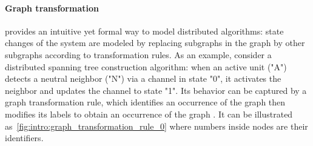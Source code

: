 \paragraph{Graph transformation} provides an intuitive yet formal way to model distributed algorithms: state changes of the system are modeled by replacing subgraphs in the graph by other subgraphs according to transformation rules.
As an example, consider a distributed spanning tree construction algorithm: when an active unit ("A") detects a neutral neighbor ("N") via a channel in state "0", it activates the neighbor and updates the channel to state "1". Its behavior can be captured by a graph transformation rule, which identifies an occurrence of the graph  then modifies its labels to obtain an occurrence of the graph . It can be illustrated as~\autoref{fig:intro:graph_transformation_rule_0} where numbers inside nodes are their identifiers.
 \begin{figure}[!htbp]
    \centering
    \caption{}
    \label{fig:intro:graph_transformation_rule_0}
\end{figure}
